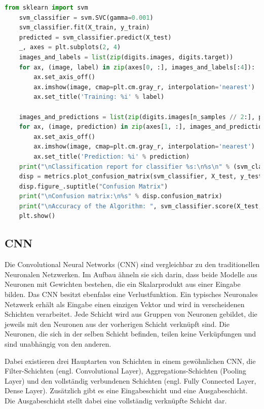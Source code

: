 \begin{minipage}{\textwidth}
	\begin{lstlisting}[language=Python, caption=Testcode, label=lst:beispielcode]
    from sklearn import svm
    svm_classifier = svm.SVC(gamma=0.001)
    svm_classifier.fit(X_train, y_train)
    predicted = svm_classifier.predict(X_test)
    _, axes = plt.subplots(2, 4)
    images_and_labels = list(zip(digits.images, digits.target))
    for ax, (image, label) in zip(axes[0, :], images_and_labels[:4]):
        ax.set_axis_off()
        ax.imshow(image, cmap=plt.cm.gray_r, interpolation='nearest')
        ax.set_title('Training: %i' % label)
        
    images_and_predictions = list(zip(digits.images[n_samples // 2:], predicted))
    for ax, (image, prediction) in zip(axes[1, :], images_and_predictions[:4]):
        ax.set_axis_off()
        ax.imshow(image, cmap=plt.cm.gray_r, interpolation='nearest')
        ax.set_title('Prediction: %i' % prediction)
    print("\nClassification report for classifier %s:\n%s\n" % (svm_classifier, metrics.classification_report(y_test, predicted)))
    disp = metrics.plot_confusion_matrix(svm_classifier, X_test, y_test)
    disp.figure_.suptitle("Confusion Matrix")
    print("\nConfusion matrix:\n%s" % disp.confusion_matrix)
    print("\nAccuracy of the Algorithm: ", svm_classifier.score(X_test, y_test))
    plt.show()
	\end{lstlisting}
\end{minipage}


\subsection{CNN}
Die Convolutional Neural Networks (CNN) sind vergleichbar zu den traditionellen Neuronalen
Netzwerken. Im Aufbau ähneln sie sich darin, dass beide Modelle aus Neuronen mit Gewichten 
bestehen, die ein Skalarprodukt aus einer Eingabe bilden. Das CNN besitzt ebenfalss eine
Verlustfunktion. Ein typisches Neuronales Netzwerk erhält als Eingabe einen einzigen Vektor und
wird in verscheidenen Schichten verarbeitet. 
Jede Schicht wird aus Gruppen von Neuronen gebildet, die jeweils mit den Neuronen aus der vorherigen
Schicht verknüpft sind. Die Neuronen, die sich in der selben Schicht befinden, teilen keine Verküpfungen und sind
unabhängig von den anderen.

Dabei existieren drei Hauptarten von Schichten in einem gewöhnlichen CNN, die Filter-Schichten (engl. Convolutional Layer), Aggregations-Schichten (Pooling Layer) 
und den vollständig verbundenen Schichten (engl. Fully Connected Layer, Dense Layer). 
Zusätzlich gibt es eine Eingabeschicht und eine Ausgabeschicht. Die Ausgabeschicht stellt dabei eine vollständig verknüpfte Schicht dar.

